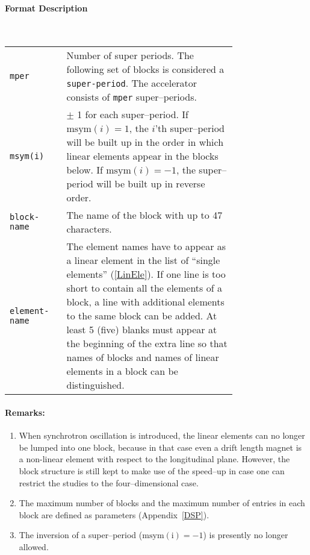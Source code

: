 \paragraph{Format Description}~

\bigskip
\begin{tabular}{@{}lp{0.75\linewidth}}
    \texttt{mper} & Number of super periods. The following set of blocks is considered a \texttt{super-period}. The accelerator consists of \texttt{mper} super--periods. \\
    \texttt{msym(i)} & $\pm$ 1 for each super--period. If $\mathrm{msym}(i)=1$, the \mbox{$i$'th} super--period will be built up in the order in which linear elements appear in the blocks  below. If $\mathrm{msym}(i)=-1$, the super--period will be built up in reverse order. \\
    \texttt{block-name} & The name of the block with up to 47 characters. \\
    \texttt{element-name} & The element names have to appear as a linear element in the list of ``single elements'' (\ref{LinEle}). If one line is too short to contain all the elements of a block, a line with additional elements to the same block can be added. At least 5 (five) blanks must appear at the beginning of the extra line so that names of blocks and names of linear elements in a block can be distinguished.
\end{tabular}

\paragraph{Remarks:}
\begin{enumerate}
    \item When synchrotron oscillation is introduced, the linear elements can no longer be lumped into one block, because in that case even a drift length magnet is a non-linear element with respect to the longitudinal plane. However, the block structure is still kept to make use of the speed--up in case one can restrict the studies to the four--dimensional case.
    \item The maximum number of blocks and the maximum number of entries in each block are defined as parameters (Appendix~\ref{DSP}).
    \item The inversion of a super--period ($\mathrm{msym(i)} = -1$) is presently no longer allowed.
\end{enumerate}

